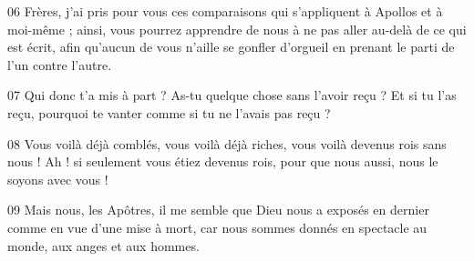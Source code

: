 
06 Frères, j’ai pris pour vous ces comparaisons qui s’appliquent à Apollos et à moi-même ; ainsi, vous pourrez apprendre de nous à ne pas aller au-delà de ce qui est écrit, afin qu’aucun de vous n’aille se gonfler d’orgueil en prenant le parti de l’un contre l’autre.

07 Qui donc t’a mis à part ? As-tu quelque chose sans l’avoir reçu ? Et si tu l’as reçu, pourquoi te vanter comme si tu ne l’avais pas reçu ?

08 Vous voilà déjà comblés, vous voilà déjà riches, vous voilà devenus rois sans nous ! Ah ! si seulement vous étiez devenus rois, pour que nous aussi, nous le soyons avec vous !

09 Mais nous, les Apôtres, il me semble que Dieu nous a exposés en dernier comme en vue d’une mise à mort, car nous sommes donnés en spectacle au monde, aux anges et aux hommes.
